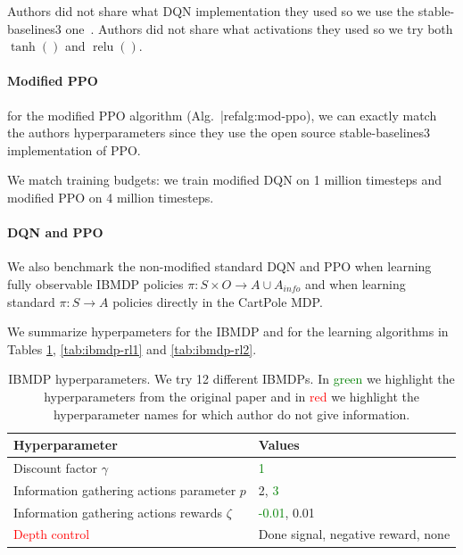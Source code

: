 Authors did not share what DQN implementation they used so we use the stable-baselines3 one~\cite{stable-baselines3}.
Authors did not share what activations they used so we try both $\operatorname{tanh}()$ and $\operatorname{relu}()$. 

\paragraph{Modified PPO} for the modified PPO algorithm (Alg.~|ref{alg:mod-ppo}), we can exactly match the authors hyperparameters since they use the open source stable-baselines3 implementation of PPO.

We match training budgets: we train modified DQN on 1 million timesteps and modified PPO on 4 million timesteps.

\paragraph{DQN and PPO} We also benchmark the non-modified standard DQN and PPO when learning fully observable IBMDP policies $\pi:S\times O\rightarrow A\cup A_{info}$ and when learning standard $\pi:S\rightarrow A$ policies directly in the CartPole MDP.

We summarize hyperpameters for the IBMDP and for the learning algorithms in Tables \ref{tab:ibmdp-params}, \ref{tab:ibmdp-rl1} and \ref{tab:ibmdp-rl2}.

\begin{table}[h]
    \centering
    \caption{IBMDP hyperparameters. We try 12 different IBMDPs. In \textcolor{green}{green} we highlight the hyperparameters from the original paper and in \textcolor{red}{red} we highlight the hyperparameter names for which author do not give information.}\label{tab:ibmdp-params}
    \begin{tabular}{ll}
    \toprule
    \textbf{Hyperparameter} & \textbf{Values}\\
    \midrule
    Discount factor $\gamma$ & \textcolor{green}{1} \\
    Information gathering actions parameter $p$ & 2, \textcolor{green}{3} \\
    Information gathering actions rewards $\zeta$ & \textcolor{green}{-0.01}, 0.01 \\
    \textcolor{red}{Depth control} & Done signal, negative reward, none \\ 
    \bottomrule
    \end{tabular}
    \end{table}

